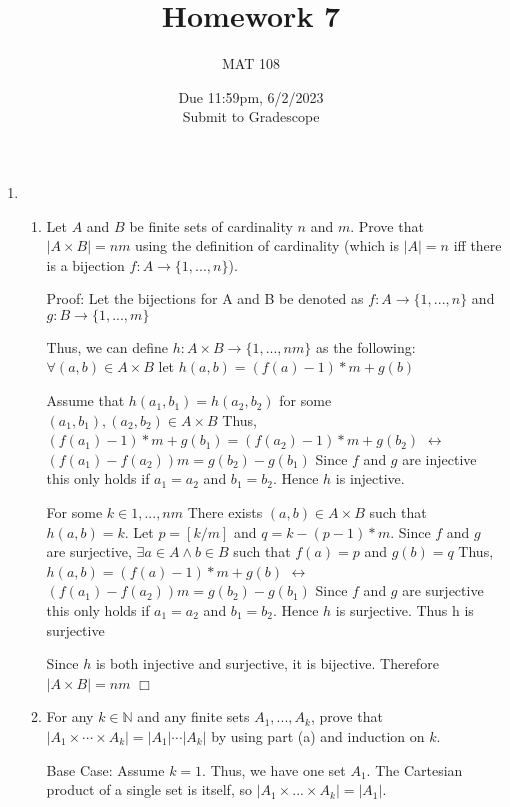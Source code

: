 \documentclass{article}
\title{Homework 7}
\author{MAT 108}
\date{Due 11:59pm, 6/2/2023\\ 
\vspace{0.1cm}
Submit to Gradescope}
\newcommand{\bN}{\mathbb{N}}
\begin{document}
 
\maketitle

{\large

\begin{enumerate}[labelindent=0pt,leftmargin=0pt]

    \setlength{\itemsep}{13pt} 

    \item \begin{enumerate}\item Let $A$ and $B$ be finite sets of cardinality $n$ and $m$. Prove that $|A\times B|=nm$ using the definition of cardinality (which is $|A|=n$ iff there is a bijection $f:A\to\{1,...,n\}$).

    Proof:
    Let the bijections for A and B be denoted as 
    $f:A\to\{1,...,n\}$ and $g:B\to\{1,...,m\}$

    Thus, we can define $h:A \times B \rightarrow \{1,...,nm\}$ as the following:
    $\forall (a,b) \in A \times B$ let $h(a,b) = (f(a)-1)*m+g(b)$

    Assume that $h(a_1,b_1)=h(a_2,b_2)$ for some $(a_1,b_1),(a_2,b_2)\in A\times B$
    Thus, $(f(a_1)-1)*m+g(b_1) = (f(a_2)-1)*m+g(b_2)$ 
    $\leftrightarrow$ $(f(a_1)-f(a_2))m = g(b_2)-g(b_1)$
    Since $f$ and $g$ are injective this only holds if $a_1 = a_2$ and $b_1 = b_2$.
    Hence $h$ is injective. 

    For some $k \in {1,...,nm}$ There exists $(a,b) \in A \times B$ such that 
    $h(a,b) = k$. Let $p = [k/m] $ and $q=k-(p-1)*m$.
    Since $f$ and $g$ are surjective, $\exists a \in A \land b \in B$
    such that $f(a)=p$ and $g(b)=q$
    Thus, $h(a,b) = (f(a)-1)*m + g(b)$
    $\leftrightarrow$ $(f(a_1)-f(a_2))m = g(b_2)-g(b_1)$
    Since $f$ and $g$ are surjective this only holds if $a_1 = a_2$ and $b_1 = b_2$.
    Hence $h$ is surjective. 
    Thus h is surjective

    Since $h$ is both injective and surjective, it is bijective.
    Therefore $|A \times B| =nm$
    $\Box$

    
    \item For any $k\in\bN$ and any finite sets $A_1,...,A_k$, prove that $|A_1\times\cdots\times A_k|=|A_1|\cdots|A_k|$ by using part (a) and induction on $k$.

    Base Case: Assume $k=1$. Thus, we have one set $A_1$. The Cartesian product of a single set is itself, 
    so $|A_1 \times ... \times A_k| = |A_1|$.


\end{enumerate}
\end{enumerate}}
\end{document}
